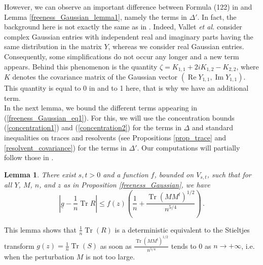 \documentclass[11pt,a4paper]{article}
\DeclareMathOperator{\1}{\mathbf{1}}
\DeclareMathOperator{\Reel}{\mathrm{Re}}
\DeclareMathOperator{\Imag}{\mathrm{Im}}
\DeclareMathOperator{\Tr}{\mathrm{Tr}}
\newcommand{\gbar}{\underline{g}}
\newtheorem{Lemma}[Proposition]{Lemma}
\theoremstyle{definition}
\begin{document}
However, we can observe an important difference between Formula (122) in \cite{VLM} and Lemma \ref{freeness_Gaussian_lemma1}, namely the terms in $\Delta'$. In fact, the background here is not exactly the same as in \cite{VLM}. Indeed, Vallet \emph{et al.} consider complex Gaussian entries with independent real and imaginary parts having the same distribution in the matrix $Y$, whereas we consider real Gaussian entries. Consequently, some simplifications do not occur any longer and a new term appears. Behind this phenomenon is the quantity $\zeta = K_{1,1} + 2iK_{1,2} - K_{2,2}$, where $K$ denotes the covariance matrix of the Gaussian vector $(\Reel Y_{1,1}, \Imag Y_{1,1})$. This quantity is equal to 0 in \cite{VLM} and to 1 here, that is why we have an additional term.\\

In the next lemma, we bound the different terms appearing in (\ref{freeness_Gaussian_eq1}). For this, we will use the concentration bounds (\ref{concentration1}) and (\ref{concentration2}) for the terms in $\Delta$ and standard inequalities on traces and resolvents (see Propositions \ref{prop_trace} and \ref{resolvent_covariance}) for the terms in $\Delta'$. Our computations will partially follow those in \cite{VLM}.

\begin{Lemma} \label{freeness_Gaussian_lemma2}
There exist $s,t>0$ and a function $f$, bounded on $V_{s,t}$, such that for all $Y$, $M$, $n$, and $z$ as in Proposition \ref{freeness_Gaussian}, we have
\begin{displaymath}
\left| \gbar - \frac1n \Tr R \right| \le f(z) \left( \frac1n + \frac{\Tr(MM^t)^{1/2}}{n^{5/4}} \right) \, .
\end{displaymath}
\end{Lemma}

This lemma shows that $\frac1n \Tr(R)$ is a deterministic equivalent to the Stieltjes transform $g(z) = \frac1n \Tr(S)$ as soon as $\frac{\Tr(MM^t)^{1/2}}{n^{5/4}}$ tends to 0 as $n \to +\infty$, i.e. when the perturbation $M$ is not too large.
\end{document}
